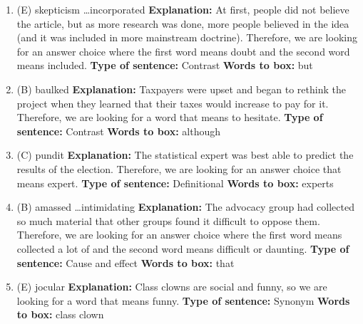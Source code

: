 \begin{enumerate}
\begin{enumerate}
\item (E) skepticism \ldots incorporated
\textbf{Explanation:} At  first, people did not believe the article, but as more research was done, more people believed in the idea (and it was included in more mainstream doctrine). Therefore, we are looking for an answer choice where the first word means doubt and the second word means included. 
\textbf{Type of sentence:} Contrast
\textbf{Words to box:} but
\item (B) baulked
\textbf{Explanation:} Taxpayers were upset and began to rethink the project when they learned that their taxes would increase to pay for it. Therefore, we are looking for a word that means to hesitate. 
\textbf{Type of sentence:} Contrast
\textbf{Words to box:} although

\item (C) pundit
\textbf{Explanation:} The statistical expert was best able to predict the results of the election. Therefore, we are looking for an answer choice that means expert. 
\textbf{Type of sentence:} Definitional
\textbf{Words to box:} experts
\item (B) amassed \ldots intimidating
\textbf{Explanation:} The advocacy group had collected so much material that other groups found it difficult to oppose them. Therefore, we are looking for an answer choice where the first word means collected a lot of and the second word means difficult or daunting.
\textbf{Type of sentence:} Cause and effect
\textbf{Words to box:} that
\item (E) jocular
\textbf{Explanation:} Class clowns are social and funny, so we are looking for a word that means funny. 
\textbf{Type of sentence:} Synonym
\textbf{Words to box:} class clown


\end{enumerate}
\end{enumerate}
